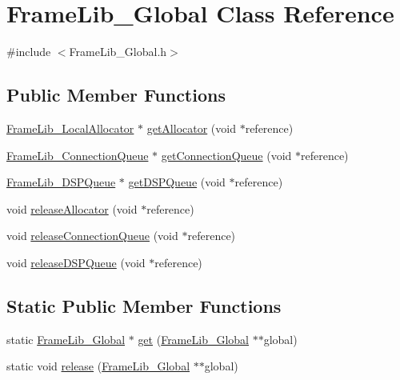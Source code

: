\hypertarget{class_frame_lib___global}{}\section{Frame\+Lib\+\_\+\+Global Class Reference}
\label{class_frame_lib___global}


{\ttfamily \#include $<$Frame\+Lib\+\_\+\+Global.\+h$>$}

\subsection*{Public Member Functions}
\begin{DoxyCompactItemize}
\item 
\hyperlink{class_frame_lib___local_allocator}{Frame\+Lib\+\_\+\+Local\+Allocator} $\ast$ \hyperlink{class_frame_lib___global_a31c3fae37e27c9cce286d30ed30838d3}{get\+Allocator} (void $\ast$reference)
\item 
\hyperlink{class_frame_lib___connection_queue}{Frame\+Lib\+\_\+\+Connection\+Queue} $\ast$ \hyperlink{class_frame_lib___global_ae0cfe1ff49ba163758fcb66f9e94b991}{get\+Connection\+Queue} (void $\ast$reference)
\item 
\hyperlink{class_frame_lib___d_s_p_queue}{Frame\+Lib\+\_\+\+D\+S\+P\+Queue} $\ast$ \hyperlink{class_frame_lib___global_a5b4e45a675ea406538781011f7ebc153}{get\+D\+S\+P\+Queue} (void $\ast$reference)
\item 
void \hyperlink{class_frame_lib___global_a78b0ff45eb662f12c41bdd641a416539}{release\+Allocator} (void $\ast$reference)
\item 
void \hyperlink{class_frame_lib___global_ab461ad3b4bdd9c580018373cf1617b1b}{release\+Connection\+Queue} (void $\ast$reference)
\item 
void \hyperlink{class_frame_lib___global_a118b451294a2893fa60edfb09f60002a}{release\+D\+S\+P\+Queue} (void $\ast$reference)
\end{DoxyCompactItemize}
\subsection*{Static Public Member Functions}
\begin{DoxyCompactItemize}
\item 
static \hyperlink{class_frame_lib___global}{Frame\+Lib\+\_\+\+Global} $\ast$ \hyperlink{class_frame_lib___global_ac9a895677da386e8fde525c061a854e4}{get} (\hyperlink{class_frame_lib___global}{Frame\+Lib\+\_\+\+Global} $\ast$$\ast$global)
\item 
static void \hyperlink{class_frame_lib___global_a079e2b866b66d477ae551e0b0e12ea11}{release} (\hyperlink{class_frame_lib___global}{Frame\+Lib\+\_\+\+Global} $\ast$$\ast$global)
\end{DoxyCompactItemize}


